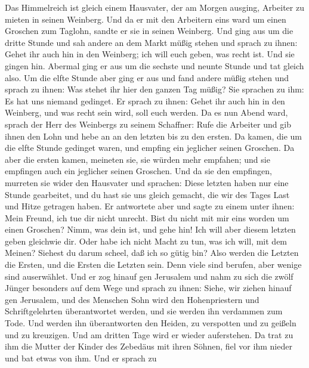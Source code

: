  Das Himmelreich ist gleich einem Hausvater, der am Morgen
ausging, Arbeiter zu mieten in seinen Weinberg.  Und da er
mit den Arbeitern eins ward um einen Groschen zum Taglohn, sandte er sie
in seinen Weinberg.  Und ging aus um die dritte Stunde und
sah andere an dem Markt müßig stehen  und sprach zu ihnen:
Gehet ihr auch hin in den Weinberg; ich will euch geben, was recht ist.
 Und sie gingen hin. Abermal ging er aus um die sechste und
neunte Stunde und tat gleich also.  Um die elfte Stunde aber
ging er aus und fand andere müßig stehen und sprach zu ihnen: Was stehet
ihr hier den ganzen Tag müßig?  Sie sprachen zu ihm: Es hat
uns niemand gedinget. Er sprach zu ihnen: Gehet ihr auch hin in den
Weinberg, und was recht sein wird, soll euch werden.  Da es
nun Abend ward, sprach der Herr des Weinbergs zu seinem Schaffner: Rufe
die Arbeiter und gib ihnen den Lohn und hebe an an den letzten bis zu
den ersten.  Da kamen, die um die elfte Stunde gedinget
waren, und empfing ein jeglicher seinen Groschen.  Da aber
die ersten kamen, meineten sie, sie würden mehr empfahen; und sie
empfingen auch ein jeglicher seinen Groschen.  Und da sie
den empfingen, murreten sie wider den Hausvater  und
sprachen: Diese letzten haben nur eine Stunde gearbeitet, und du hast
sie uns gleich gemacht, die wir des Tages Last und Hitze getragen haben.
 Er antwortete aber und sagte zu einem unter ihnen: Mein
Freund, ich tue dir nicht unrecht. Bist du nicht mit mir eins worden um
einen Groschen?  Nimm, was dein ist, und gehe hin! Ich will
aber diesem letzten geben gleichwie dir.  Oder habe ich
nicht Macht zu tun, was ich will, mit dem Meinen? Siehest du darum
scheel, daß ich so gütig bin?  Also werden die Letzten die
Ersten, und die Ersten die Letzten sein. Denn viele sind berufen, aber
wenige sind auserwählet.  Und er zog hinauf gen Jerusalem
und nahm zu sich die zwölf Jünger besonders auf dem Wege und sprach zu
ihnen:  Siehe, wir ziehen hinauf gen Jerusalem, und des
Menschen Sohn wird den Hohenpriestern und Schriftgelehrten überantwortet
werden, und sie werden ihn verdammen zum Tode.  Und werden
ihn überantworten den Heiden, zu verspotten und zu geißeln und zu
kreuzigen. Und am dritten Tage wird er wieder auferstehen. 
Da trat zu ihm die Mutter der Kinder des Zebedäus mit ihren Söhnen, fiel
vor ihm nieder und bat etwas von ihm.  Und er sprach zu
